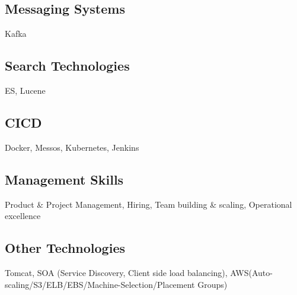 \documentclass[8pt,a4paper]{article}
\begin{document}
\begin{multicols}{2}
\subsection{Messaging Systems}
Kafka
\subsection{Search Technologies}
ES, Lucene
\subsection{CICD}
Docker, Messos, Kubernetes, Jenkins
\subsection{Management Skills}
Product \& Project Management, Hiring, Team building \& scaling, Operational excellence
\subsection{Other Technologies}
Tomcat, SOA (Service Discovery, Client side load balancing), AWS(Auto-scaling/S3/ELB/EBS/Machine-Selection/Placement Groups)



\end{multicols}
\end{document}
